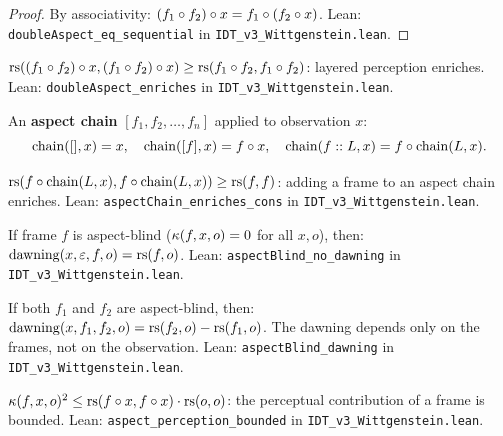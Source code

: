 \begin{proof}
By associativity: $(f_1 \circ f_2) \circ x = f_1 \circ (f_2 \circ x)$.
Lean: \texttt{doubleAspect\_eq\_sequential} in
\texttt{IDT\_v3\_Wittgenstein.lean}.
\end{proof}

\begin{theorem}
\label{thm:double-aspect-enriches}
$\mathrm{rs}((f_1 \circ f_2) \circ x, (f_1 \circ f_2) \circ x)
\geq \mathrm{rs}(f_1 \circ f_2, f_1 \circ f_2)$: layered perception enriches.
Lean: \texttt{doubleAspect\_enriches} in \texttt{IDT\_v3\_Wittgenstein.lean}.
\end{theorem}

\begin{definition}
\label{def:aspect-chain}
An \textbf{aspect chain} $[f_1, f_2, \ldots, f_n]$ applied to observation $x$:
\[
\mathrm{chain}([], x) = x, \quad \mathrm{chain}([f], x) = f \circ x, \quad
\mathrm{chain}(f :: L, x) = f \circ \mathrm{chain}(L, x).
\]
\end{definition}

\begin{theorem}
\label{thm:aspect-chain-enriches}
$\mathrm{rs}(f \circ \mathrm{chain}(L, x), f \circ \mathrm{chain}(L, x))
\geq \mathrm{rs}(f, f)$: adding a frame to an aspect chain enriches.
Lean: \texttt{aspectChain\_enriches\_cons} in
\texttt{IDT\_v3\_Wittgenstein.lean}.
\end{theorem}

\begin{theorem}
\label{thm:aspectblind-no-dawning}
If frame $f$ is aspect-blind ($\kappa(f, x, o) = 0$ for all $x, o$), then:
$\mathrm{dawning}(x, \varepsilon, f, o) = \mathrm{rs}(f, o)$.
Lean: \texttt{aspectBlind\_no\_dawning} in
\texttt{IDT\_v3\_Wittgenstein.lean}.
\end{theorem}

\begin{theorem}
\label{thm:both-aspectblind-dawning}
If both $f_1$ and $f_2$ are aspect-blind, then:
$\mathrm{dawning}(x, f_1, f_2, o) = \mathrm{rs}(f_2, o) - \mathrm{rs}(f_1, o)$.
The dawning depends only on the frames, not on the observation.
Lean: \texttt{aspectBlind\_dawning} in \texttt{IDT\_v3\_Wittgenstein.lean}.
\end{theorem}

\begin{theorem}
\label{thm:aspect-bounded}
$\kappa(f, x, o)^2 \leq \mathrm{rs}(f \circ x, f \circ x) \cdot \mathrm{rs}(o, o)$:
the perceptual contribution of a frame is bounded.
Lean: \texttt{aspect\_perception\_bounded} in
\texttt{IDT\_v3\_Wittgenstein.lean}.
\end{theorem}

